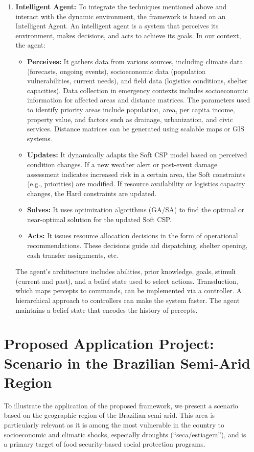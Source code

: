 \documentclass[letterpaper]{article}
\begin{document}
\begin{enumerate}
    \item \textbf{Intelligent Agent:} To integrate the techniques mentioned above and interact with the dynamic environment, the framework is based on an Intelligent Agent. An intelligent agent is a system that perceives its environment, makes decisions, and acts to achieve its goals. In our context, the agent:
          \begin{itemize}
              \item \textbf{Perceives:} It gathers data from various sources, including climate data (forecasts, ongoing events), socioeconomic data (population vulnerabilities, current needs), and field data (logistics conditions, shelter capacities). Data collection in emergency contexts includes socioeconomic information for affected areas and distance matrices. The parameters used to identify priority areas include population, area, per capita income, property value, and factors such as drainage, urbanization, and civic services. Distance matrices can be generated using scalable maps or GIS systems.
              \item \textbf{Updates:} It dynamically adapts the Soft CSP model based on perceived condition changes. If a new weather alert or post-event damage assessment indicates increased risk in a certain area, the Soft constraints (e.g., priorities) are modified. If resource availability or logistics capacity changes, the Hard constraints are updated.
              \item \textbf{Solves:} It uses optimization algorithms (GA/SA) to find the optimal or near-optimal solution for the updated Soft CSP.
              \item \textbf{Acts:} It issues resource allocation decisions in the form of operational recommendations. These decisions guide aid dispatching, shelter opening, cash transfer assignments, etc.
          \end{itemize}
          The agent’s architecture includes abilities, prior knowledge, goals, stimuli (current and past), and a belief state used to select actions. Transduction, which maps percepts to commands, can be implemented via a controller. A hierarchical approach to controllers can make the system faster. The agent maintains a belief state that encodes the history of percepts.
\end{enumerate}

\section{Proposed Application Project: Scenario in the Brazilian Semi-Arid Region}
To illustrate the application of the proposed framework, we present a scenario based on the geographic region of the Brazilian semi-arid. This area is particularly relevant as it is among the most vulnerable in the country to socioeconomic and climatic shocks, especially droughts (``seca/estiagem''), and is a primary target of food security-based social protection programs.
\end{document}
